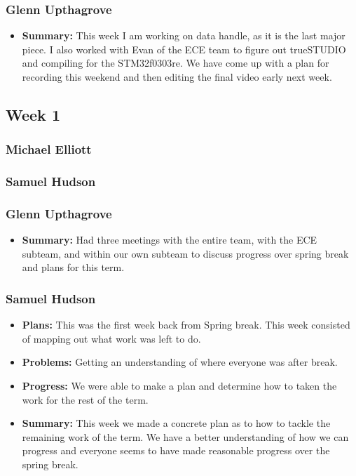 \documentclass[onecolumn, draftclsnofoot,10pt, compsoc]{IEEEtran}
\begin{document}
\subsubsection{Glenn Upthagrove}
\begin{itemize}
 \item \textbf{Summary: } This week I am working on data handle, as it is the last major piece. I also worked with Evan of the ECE team to figure out trueSTUDIO and compiling for the STM32f0303re. We have come up with a plan for recording this weekend and then editing the final video early next week.  
\end{itemize}
\subsection {Week 1}
\subsubsection{Michael Elliott}
\subsubsection{Samuel Hudson}
\subsubsection{Glenn Upthagrove}
\begin {itemize}
 \item \textbf{Summary: }Had three meetings with the entire team, with the ECE subteam, and
within our own subteam to discuss progress over spring break and plans
for this term.
\end{itemize}
\subsubsection{Samuel Hudson}
\begin {itemize}
 \item \textbf{Plans: }This was the first week back from Spring break. This week consisted of mapping out what work was left to do.   
 \item \textbf{Problems: }Getting an understanding of where everyone was after break.
 \item \textbf{Progress: }We were able to make a plan and determine how to taken the work for the rest of the term.
 \item \textbf{Summary: }This week we made a concrete plan as to how to tackle the remaining work of the term. We have a better understanding of how we can progress and everyone seems to have made reasonable progress over the spring break.  
\end {itemize}
\end{document}
